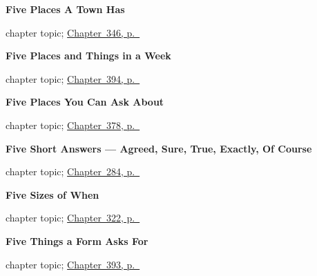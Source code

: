 \noindent\begin{minipage}[t]{\linewidth}
\raggedright
\textbf{Five Places A Town Has}\par
\footnotesize chapter topic; \hyperref[ch:lugares-del-pueblo]{Chapter~346, p.~\pageref*{ch:lugares-del-pueblo}}
\end{minipage}\par\smallskip

\noindent\begin{minipage}[t]{\linewidth}
\raggedright
\textbf{Five Places and Things in a Week}\par
\footnotesize chapter topic; \hyperref[ch:la-universidad-y-el-trabajo]{Chapter~394, p.~\pageref*{ch:la-universidad-y-el-trabajo}}
\end{minipage}\par\smallskip

\noindent\begin{minipage}[t]{\linewidth}
\raggedright
\textbf{Five Places You Can Ask About}\par
\footnotesize chapter topic; \hyperref[ch:la-selva-y-el-prado]{Chapter~378, p.~\pageref*{ch:la-selva-y-el-prado}}
\end{minipage}\par\smallskip

\noindent\begin{minipage}[t]{\linewidth}
\raggedright
\textbf{Five Short Answers --- Agreed, Sure, True, Exactly, Of Course}\par
\footnotesize chapter topic; \hyperref[ch:respuestas-cortas]{Chapter~284, p.~\pageref*{ch:respuestas-cortas}}
\end{minipage}\par\smallskip

\noindent\begin{minipage}[t]{\linewidth}
\raggedright
\textbf{Five Sizes of When}\par
\footnotesize chapter topic; \hyperref[ch:anoche-y-todavia]{Chapter~322, p.~\pageref*{ch:anoche-y-todavia}}
\end{minipage}\par\smallskip

\noindent\begin{minipage}[t]{\linewidth}
\raggedright
\textbf{Five Things a Form Asks For}\par
\footnotesize chapter topic; \hyperref[ch:el-ordenador-y-el-correo-electronico]{Chapter~393, p.~\pageref*{ch:el-ordenador-y-el-correo-electronico}}
\end{minipage}\par\smallskip


